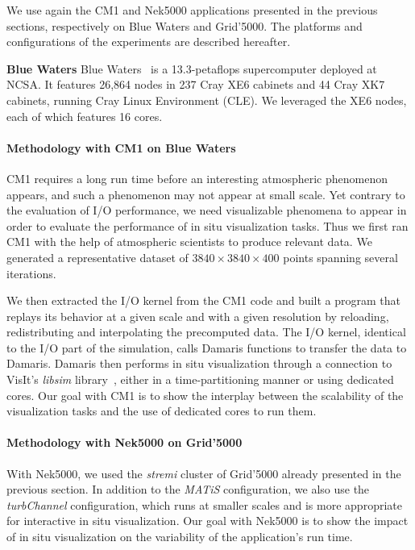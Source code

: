 We use again the CM1 and Nek5000 applications
presented in the previous sections, respectively on Blue Waters and Grid'5000.
The platforms and configurations of the experiments are described hereafter.

\begin{description}
\item{\textbf{Blue Waters}}
Blue Waters~\cite{bluewaters} is a 13.3-petaflops supercomputer deployed at NCSA.
It features 26,864 nodes in 237 Cray XE6 cabinets
and 44 Cray XK7 cabinets, running Cray Linux Environment (CLE). 
We leveraged the XE6 nodes, each of which features 16 cores.
\end{description}

\paragraph{Methodology with CM1 on Blue Waters}
CM1 requires a long run time before an interesting atmospheric phenomenon appears,
and such a phenomenon may not appear at small scale. Yet contrary to the evaluation of
I/O performance, we need visualizable phenomena to appear in order to evaluate the 
performance of in situ visualization tasks.
Thus we first ran CM1 with the help of atmospheric
scientists to produce relevant data. We generated a representative dataset of 
$3840 \times 3840 \times 400$ points spanning several iterations.

We then extracted the I/O kernel 
from the CM1 code and built a program that replays its behavior at a given scale 
and with a given resolution by reloading, redistributing and interpolating the 
precomputed data.
The I/O kernel, identical to the I/O part of the simulation, calls Damaris
functions to transfer the data to Damaris. Damaris then performs in situ visualization
through a connection to VisIt's \emph{libsim} library~\cite{whitlock2011parallel}, 
either in a time-partitioning manner or using dedicated cores.
Our goal with CM1 is to show the interplay between the scalability of the
visualization tasks and the use of dedicated cores to run them.

\paragraph{Methodology with Nek5000 on Grid'5000}
With Nek5000, we used the \emph{stremi} cluster of Grid'5000 already presented
in the previous section. In addition to the \emph{MATiS} configuration, we also
use the \emph{turbChannel} configuration, which runs at smaller scales and is
more appropriate for interactive in situ visualization.
Our goal with Nek5000 is to show the impact of in situ visualization on the variability of
the application's run time.

